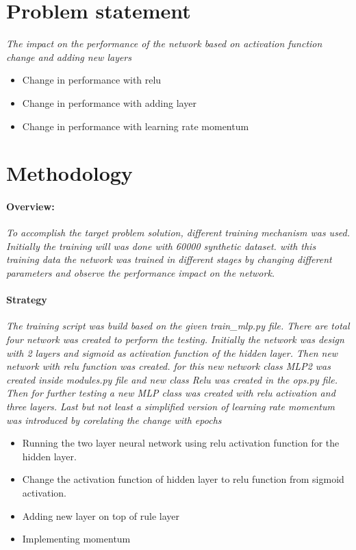 \documentclass[a4 paper]{article}
\begin{document}
\section{Problem statement}
\textit{The impact on the performance of the network based on activation function change and adding new layers} 
\begin{itemize}
    \item Change in performance with relu
    \item Change in performance with adding layer 
    \item Change in performance with learning rate momentum
\end{itemize}

\section{Methodology}

\paragraph{Overview:}\textit{To accomplish the target problem solution, different training mechanism was used. Initially the training will was done with 60000 synthetic dataset. with this training data the network was trained in different stages by changing different parameters and observe the performance impact on the network.}

\paragraph{Strategy}\textit{The training script was build based on the given train\_mlp.py file. There are total four network was created to perform the testing. Initially the network was design with 2 layers and sigmoid as activation function of the hidden layer. Then new network with relu function was created. for this new network class MLP2 was created inside modules.py file and new class Relu was created in the ops.py file. Then for further testing a new MLP class was created with relu activation and three layers. Last but not least a simplified version of learning rate momentum was introduced by corelating the change with epochs}

\begin{itemize}
    \item Running the two layer neural network using relu activation function for the hidden layer.
    \item Change the activation function of hidden layer to relu function from sigmoid activation.
    \item Adding new layer on top of rule layer 
    \item Implementing momentum
\end{itemize}
\end{document}

